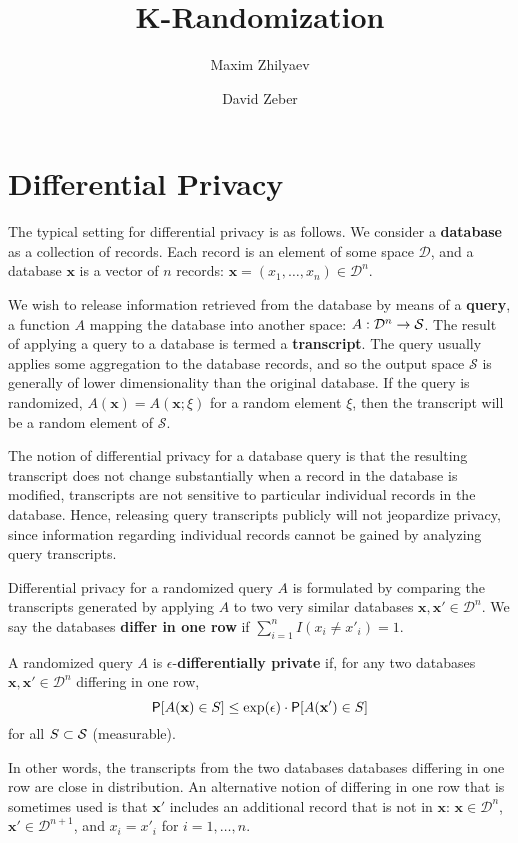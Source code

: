 \documentclass[11pt,draft]{article}
\title{K-Randomization}
\author{Maxim Zhilyaev \and David Zeber}
\newcommand{\Dsp}{\mathcal{D}}
\newcommand{\Ssp}{\mathcal{S}}
\newcommand{\xv}{\mathbf{x}}
\begin{document}
\maketitle

\section{Differential Privacy}
\label{sec:dp}

The typical setting for differential privacy is as follows. 
We consider a \textbf{database} as a collection of records. 
Each record is an element of some space $\Dsp$, and a database $\xv$ is a vector of $n$ records: $\xv = (x_1,\dots,x_n) \in \Dsp^n$.

We wish to release information retrieved from the database by means of a \textbf{query}, a function $A$ mapping the database into another space: $\map{A}{\Dsp^n}{\Ssp}$. The result of applying a query to a database is termed a \textbf{transcript}.
The query usually applies some aggregation to the database records, and so the output space $\Ssp$ is generally of lower dimensionality than the original database.
If the query is randomized, \ie $A(\xv) = A(\xv; \xi)$ for a random element $\xi$, then the transcript will be a random element of $\Ssp$.

The notion of differential privacy for a database query is that the resulting transcript does not change substantially when a record in the database is modified,
\ie transcripts are not sensitive to particular individual records in the database.
Hence, releasing query transcripts publicly will not jeopardize privacy, since information regarding individual records cannot be gained by analyzing query transcripts.


Differential privacy for a randomized query $A$ is formulated by comparing the transcripts generated by applying $A$ to two very similar databases $\xv,\xv' \in \Dsp^n$.
We say the databases \textbf{differ in one row} if 
$\sum_{i=1}^n I(x_i \neq x'_i) = 1$.
\begin{defn}
A randomized query $A$ is $\epsilon$-\textbf{differentially private} if, 
for any two databases $\xv,\xv' \in \Dsp^n$ differing in one row,
\begin{equation}\label{eq:dpdef}
\P[A(\xv) \in S] \leq \exp(\epsilon) \cdot \P[A(\xv') \in S]
\end{equation}
for all $S \cont \Ssp$ (measurable).
\end{defn}
In other words, the transcripts from the two databases databases differing in one row are close in distribution.
An alternative notion of differing in one row that is sometimes used is that $\xv'$ includes an additional record that is not in $\xv$:
$\xv\in \Dsp^n$, $\xv' \in \Dsp^{n+1}$, and $x_i = x'_i$ for $i = 1,\dots,n$.
\end{document}
